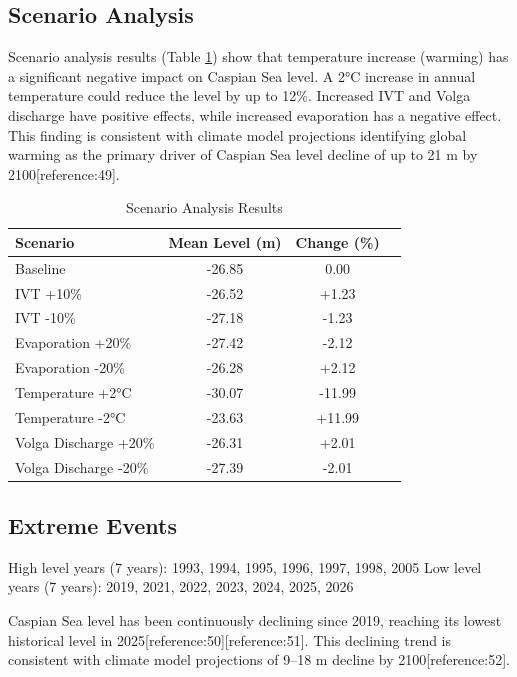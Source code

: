 \documentclass[12pt,letterpaper]{article}
\begin{document}
\subsection{Scenario Analysis}

Scenario analysis results (Table \ref{tab:scenario_en}) show that temperature increase (warming) has a significant negative impact on Caspian Sea level. A 2°C increase in annual temperature could reduce the level by up to 12\%. Increased IVT and Volga discharge have positive effects, while increased evaporation has a negative effect. This finding is consistent with climate model projections identifying global warming as the primary driver of Caspian Sea level decline of up to 21 m by 2100[reference:49].

\begin{table}[H]
\centering
\caption{Scenario Analysis Results}
\label{tab:scenario_en}
\begin{tabular}{lccc}
\toprule
\textbf{Scenario} & \textbf{Mean Level (m)} & \textbf{Change (\%)} \\
\midrule
Baseline & -26.85 & 0.00 \\
IVT +10\% & -26.52 & +1.23 \\
IVT -10\% & -27.18 & -1.23 \\
Evaporation +20\% & -27.42 & -2.12 \\
Evaporation -20\% & -26.28 & +2.12 \\
Temperature +2°C & -30.07 & -11.99 \\
Temperature -2°C & -23.63 & +11.99 \\
Volga Discharge +20\% & -26.31 & +2.01 \\
Volga Discharge -20\% & -27.39 & -2.01 \\
\bottomrule
\end{tabular}
\end{table}

\subsection{Extreme Events}

High level years (7 years): 1993, 1994, 1995, 1996, 1997, 1998, 2005  
Low level years (7 years): 2019, 2021, 2022, 2023, 2024, 2025, 2026

Caspian Sea level has been continuously declining since 2019, reaching its lowest historical level in 2025[reference:50][reference:51]. This declining trend is consistent with climate model projections of 9–18 m decline by 2100[reference:52].
\end{document}
